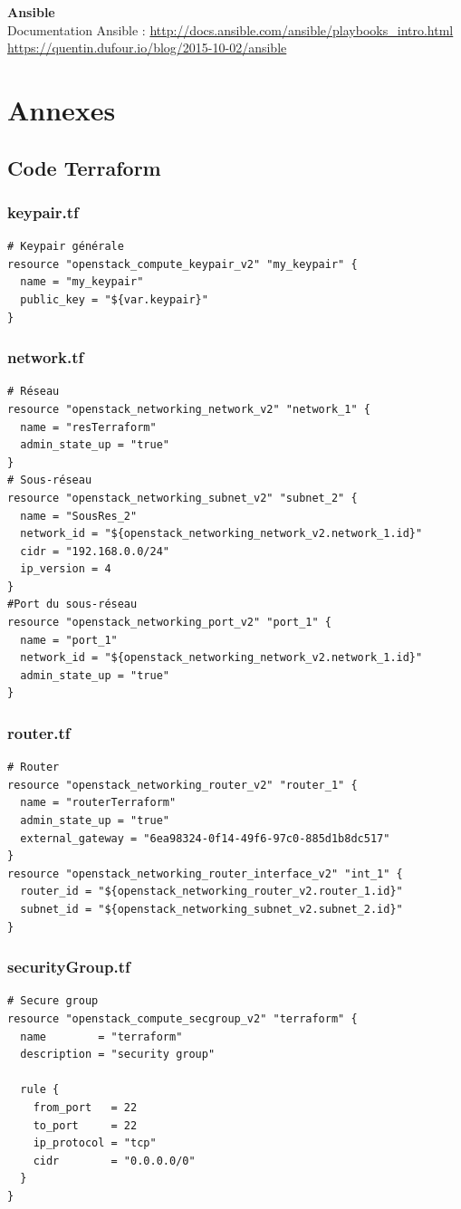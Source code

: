 \documentclass[]{article}
\begin{document}
\textbf{Ansible}\\
Documentation Ansible : \url{http://docs.ansible.com/ansible/playbooks_intro.html}\\
\url{https://quentin.dufour.io/blog/2015-10-02/ansible}
\newpage

\section{Annexes}
\subsection*{Code Terraform}
\subsubsection*{keypair.tf}
\begin{verbatim}
# Keypair générale
resource "openstack_compute_keypair_v2" "my_keypair" {
  name = "my_keypair"
  public_key = "${var.keypair}"
}
\end{verbatim}
\subsubsection*{network.tf}
\begin{verbatim}
# Réseau
resource "openstack_networking_network_v2" "network_1" {
  name = "resTerraform"
  admin_state_up = "true"
}
# Sous-réseau
resource "openstack_networking_subnet_v2" "subnet_2" {
  name = "SousRes_2"
  network_id = "${openstack_networking_network_v2.network_1.id}"
  cidr = "192.168.0.0/24"
  ip_version = 4 
}
#Port du sous-réseau
resource "openstack_networking_port_v2" "port_1" {
  name = "port_1"
  network_id = "${openstack_networking_network_v2.network_1.id}"
  admin_state_up = "true"
}
\end{verbatim}
\subsubsection*{router.tf}
\begin{verbatim}
# Router
resource "openstack_networking_router_v2" "router_1" {
  name = "routerTerraform"
  admin_state_up = "true"
  external_gateway = "6ea98324-0f14-49f6-97c0-885d1b8dc517"
}
resource "openstack_networking_router_interface_v2" "int_1" {
  router_id = "${openstack_networking_router_v2.router_1.id}"
  subnet_id = "${openstack_networking_subnet_v2.subnet_2.id}"
}
\end{verbatim}
\subsubsection*{securityGroup.tf}
\begin{verbatim}
# Secure group
resource "openstack_compute_secgroup_v2" "terraform" {
  name        = "terraform"
  description = "security group"
  
  rule {
    from_port   = 22
    to_port     = 22
    ip_protocol = "tcp"
    cidr        = "0.0.0.0/0"
  }
}
\end{verbatim}
\end{document}
